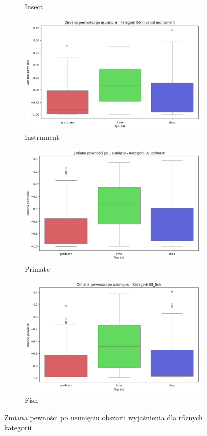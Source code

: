\begin{figure}
\begin{subfigure}[b]{0.3\textwidth}
		\caption{Insect}  \label{rys:base_confidence_no_exp_insect}
	\end{subfigure}
	\begin{subfigure}[b]{0.3\textwidth}
		\centering\includegraphics[width=.9\textwidth]{img/base_confidence_no_exp_music}
		\caption{Instrument}  \label{rys:base_confidence_no_exp_music}
	\end{subfigure}
	\begin{subfigure}[b]{0.3\textwidth}
		\centering\includegraphics[width=.9\textwidth]{img/base_confidence_no_exp_primate}
		\caption{Primate}  \label{rys:base_confidence_no_exp_primate}
	\end{subfigure}
	\begin{subfigure}[b]{0.3\textwidth}
		\centering\includegraphics[width=.9\textwidth]{img/base_confidence_no_exp_fish}
		\caption{Fish}  \label{rys:base_confidence_no_exp_fish}
	\end{subfigure}
	\caption{Zmiana pewności po usunięciu obszaru wyjaśnienia dla różnych kategorii}
\end{figure}

